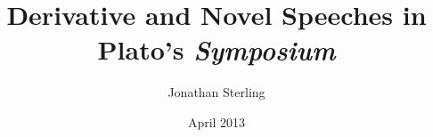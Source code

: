 \documentclass[letterpaper, 12pt]{article}
\begin{document}
\doublespacing

\author{Jonathan Sterling}

\title{Derivative and Novel Speeches in Plato's \emph{Symposium}}
\date{April 2013}
\maketitle


\end{document}
